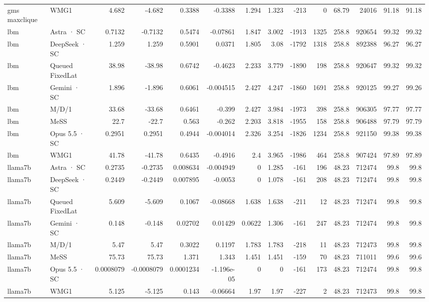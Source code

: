 \begin{tabular}{llrrrrrrrrrrrr}
gms maxclique & WMG1 & 4.682 & -4.682 & 0.3388 & -0.3388 & 1.294 & 1.323 & -213 & 0 & 68.79 & 24016 & 91.18 & 91.18 \\
lbm & Astra · SC & 0.7132 & -0.7132 & 0.5474 & -0.07861 & 1.847 & 3.002 & -1913 & 1325 & 258.8 & 920654 & 99.32 & 99.32 \\
lbm & DeepSeek · SC & 1.259 & 1.259 & 0.5901 & 0.0371 & 1.805 & 3.08 & -1792 & 1318 & 258.8 & 892388 & 96.27 & 96.27 \\
lbm & Queued FixedLat & 38.98 & -38.98 & 0.6742 & -0.4623 & 2.233 & 3.779 & -1890 & 198 & 258.8 & 920647 & 99.32 & 99.32 \\
lbm & Gemini · SC & 1.896 & -1.896 & 0.6061 & -0.004515 & 2.427 & 4.247 & -1860 & 1691 & 258.8 & 920125 & 99.27 & 99.26 \\
lbm & M/D/1 & 33.68 & -33.68 & 0.6461 & -0.399 & 2.427 & 3.984 & -1973 & 398 & 258.8 & 906305 & 97.77 & 97.77 \\
lbm & MeSS & 22.7 & -22.7 & 0.563 & -0.262 & 2.203 & 3.818 & -1955 & 158 & 258.8 & 906488 & 97.79 & 97.79 \\
lbm & Opus 5.5 · SC & 0.2951 & 0.2951 & 0.4944 & -0.004014 & 2.326 & 3.254 & -1826 & 1234 & 258.8 & 921150 & 99.38 & 99.38 \\
lbm & WMG1 & 41.78 & -41.78 & 0.6435 & -0.4916 & 2.4 & 3.965 & -1986 & 464 & 258.8 & 907424 & 97.89 & 97.89 \\
llama7b & Astra · SC & 0.2735 & -0.2735 & 0.008634 & -0.004949 & 0 & 1.285 & -161 & 196 & 48.23 & 712474 & 99.8 & 99.8 \\
llama7b & DeepSeek · SC & 0.2449 & -0.2449 & 0.007895 & -0.0053 & 0 & 1.078 & -161 & 208 & 48.23 & 712474 & 99.8 & 99.8 \\
llama7b & Queued FixedLat & 5.609 & -5.609 & 0.1067 & -0.08668 & 1.638 & 1.638 & -211 & 12 & 48.23 & 712474 & 99.8 & 99.8 \\
llama7b & Gemini · SC & 0.148 & -0.148 & 0.02702 & 0.01429 & 0.0622 & 1.306 & -161 & 247 & 48.23 & 712474 & 99.8 & 99.8 \\
llama7b & M/D/1 & 5.47 & 5.47 & 0.3022 & 0.1197 & 1.783 & 1.783 & -218 & 11 & 48.23 & 712473 & 99.8 & 99.8 \\
llama7b & MeSS & 75.73 & 75.73 & 1.371 & 1.343 & 1.451 & 1.451 & -159 & 70 & 48.23 & 711011 & 99.6 & 99.6 \\
llama7b & Opus 5.5 · SC & 0.0008079 & -0.0008079 & 0.0001234 & -1.196e-05 & 0 & 0 & -161 & 173 & 48.23 & 712474 & 99.8 & 99.8 \\
llama7b & WMG1 & 5.125 & -5.125 & 0.143 & -0.06664 & 1.97 & 1.97 & -227 & 2 & 48.23 & 712473 & 99.8 & 99.8 \\

\end{tabular}
